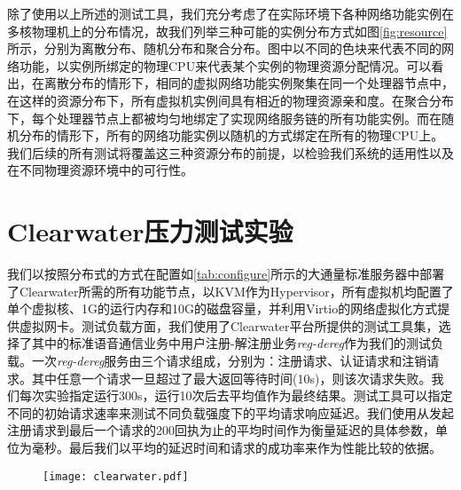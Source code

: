 \begin{figure}[!htp]
	\centering
\end{figure}
除了使用以上所述的测试工具，我们充分考虑了在实际环境下各种网络功能实例在多核物理机上的分布情况，故我们列举三种可能的实例分布方式如图\ref{fig:resource}所示，分别为离散分布、随机分布和聚合分布。图中以不同的色块来代表不同的网络功能，以实例所绑定的物理CPU来代表某个实例的物理资源分配情况。可以看出，在离散分布的情形下，相同的虚拟网络功能实例聚集在同一个处理器节点中，在这样的资源分布下，所有虚拟机实例间具有相近的物理资源亲和度。在聚合分布下，每个处理器节点上都被均匀地绑定了实现网络服务链的所有功能实例。而在随机分布的情形下，所有的网络功能实例以随机的方式绑定在所有的物理CPU上。我们后续的所有测试将覆盖这三种资源分布的前提，以检验我们系统的适用性以及在不同物理资源环境中的可行性。


\section{Clearwater压力测试实验}
我们以按照分布式的方式在配置如\ref{tab:configure}所示的大通量标准服务器中部署了Clearwater所需的所有功能节点，以KVM作为Hypervisor，所有虚拟机均配置了单个虚拟核、1G的运行内存和10G的磁盘容量，并利用Virtio的网络虚拟化方式提供虚拟网卡。测试负载方面，我们使用了Clearwater平台所提供的测试工具集，选择了其中的标准语音通信业务中用户注册-解注册业务\textit{reg-dereg}作为我们的测试负载。一次\textit{reg-dereg}服务由三个请求组成，分别为：注册请求、认证请求和注销请求。其中任意一个请求一旦超过了最大返回等待时间(10s)，则该次请求失败。我们每次实验指定运行300s，运行10次后去平均值作为最终结果。测试工具可以指定不同的初始请求速率来测试不同负载强度下的平均请求响应延迟。我们使用从发起注册请求到最后一个请求的200回执为止的平均时间作为衡量延迟的具体参数，单位为毫秒。最后我们以平均的延迟时间和请求的成功率来作为性能比较的依据。

\begin{figure}[htp]
	\centering
	\texttt{[image: clearwater.pdf]}
\end{figure}

